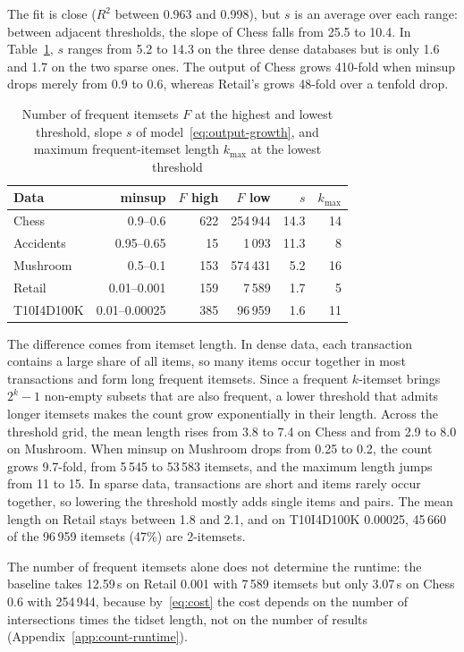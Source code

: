 The fit is close ($R^2$ between 0.963 and 0.998), but $s$ is an average over each range:
between adjacent thresholds, the slope of Chess falls from 25.5 to 10.4. In
Table~\ref{tab:output-growth}, $s$ ranges from 5.2 to 14.3 on the three dense databases
but is only 1.6 and 1.7 on the two sparse ones. The output of Chess grows 410-fold when
minsup drops merely from 0.9 to 0.6, whereas Retail's grows 48-fold over a tenfold drop.

\begin{table}[t]
\centering
\small
\caption{Number of frequent itemsets $F$ at the highest and lowest threshold, slope $s$
of model~\eqref{eq:output-growth}, and maximum frequent-itemset length $k_{\max}$ at the
lowest threshold}
\label{tab:output-growth}
\setlength{\tabcolsep}{4pt}
\begin{tabular}{lrrrrr}
\hline
Data & minsup & $F$ high & $F$ low & $s$ & $k_{\max}$ \\
\hline
Chess & 0.9--0.6 & 622 & 254\,944 & 14.3 & 14 \\
Accidents & 0.95--0.65 & 15 & 1\,093 & 11.3 & 8 \\
Mushroom & 0.5--0.1 & 153 & 574\,431 & 5.2 & 16 \\
Retail & 0.01--0.001 & 159 & 7\,589 & 1.7 & 5 \\
T10I4D100K & 0.01--0.00025 & 385 & 96\,959 & 1.6 & 11 \\
\hline
\end{tabular}
\end{table}

The difference comes from itemset length. In dense data, each transaction contains a
large share of all items, so many items occur together in most transactions and form long
frequent itemsets. Since a frequent $k$-itemset brings $2^k - 1$ non-empty subsets that
are also frequent, a lower threshold that admits longer itemsets makes the count grow
exponentially in their length. Across the threshold grid, the mean length rises from 3.8
to 7.4 on Chess and from 2.9 to 8.0 on Mushroom. When minsup on Mushroom drops from 0.25
to 0.2, the count grows 9.7-fold, from 5\,545 to 53\,583 itemsets, and the maximum length
jumps from 11 to 15. In sparse data, transactions are short and items rarely occur
together, so lowering the threshold mostly adds single items and pairs. The mean length on
Retail stays between 1.8 and 2.1, and on T10I4D100K 0.00025, 45\,660 of the 96\,959
itemsets (47\%) are 2-itemsets.

The number of frequent itemsets alone does not determine the runtime: the baseline takes
12.59\,s on Retail 0.001 with 7\,589 itemsets but only 3.07\,s on Chess 0.6 with
254\,944, because by~\eqref{eq:cost} the cost depends on the number of intersections
times the tidset length, not on the number of results (Appendix~\ref{app:count-runtime}).

